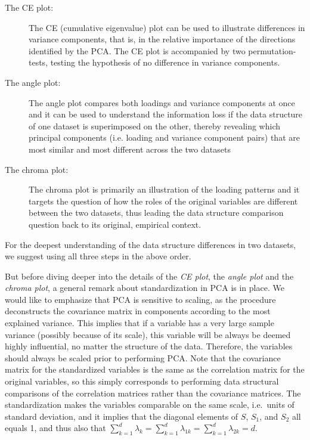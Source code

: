 \documentclass[titlepage,11pt,twoside]{article}
\begin{document}
\begin{description}
\item[The CE plot:] The CE (cumulative eigenvalue) plot can be used to illustrate differences in variance components, that is, in the relative importance of the directions identified by the PCA. The CE plot is accompanied by two permutation-tests, testing the hypothesis of no difference in variance components.
\item[The angle plot:] The angle plot compares both loadings and variance components at once and it can be used to understand the information loss if the data structure of one dataset is superimposed on the other, thereby revealing which principal components (i.e. loading and variance component pairs) that are most similar and most different across the two datasets
\item[The chroma plot:] The chroma plot is primarily an illustration of the loading patterns and it targets the question of how the roles of the original variables are different between the two datasets, thus leading the data structure comparison question back to its original, empirical context.
\end{description}
For the deepest understanding of the data structure differences in two datasets, we suggest using all three steps in the above order. 

But before diving deeper into the details of the \emph{CE plot}, the \emph{angle plot} and the \emph{chroma plot}, a general remark about standardization in PCA is in place. We would like to emphasize that PCA is sensitive to scaling, as the procedure deconstructs the covariance matrix in components according to the most explained variance. This implies that if a variable has a very large sample variance (possibly because of its scale), this variable will be always be deemed highly influential, no matter the structure of the data. Therefore, the variables should always be scaled prior to performing PCA. Note that the covariance matrix for the standardized variables is the same as the correlation matrix for the original variables, so this simply corresponds to performing data structural comparisons of the correlation matrices rather than the covariance matrices. The standardization makes the variables comparable on the same scale, i.e.\ units of standard deviation, and it implies that the diagonal elements of $S$, $S_1$, and $S_2$ all equals 1, and thus also that $\sum_{k=1}^d \lambda_k = \sum_{k=1}^d \lambda_{1k} = \sum_{k=1}^d \lambda_{2k} =  d$. 
\end{document}
